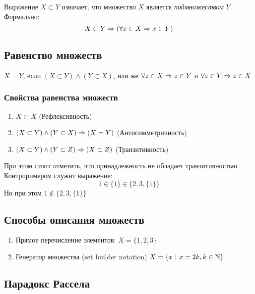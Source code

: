 \begin{definition}
    Выражение $X \subset Y$ означает, что множество $X$ является \textit{подмножеством} $Y$. Формально:
    $$
        X \subset Y \Rightarrow (\forall x \in X \Rightarrow x \in Y)
    $$
\end{definition}
 
\subsection{Равенство множеств}
 
\begin{definition}
    $X = Y$, если $(X \subset Y) \wedge (Y \subset X)$, или же $\forall z \in X \Rightarrow z \in Y$ и $\forall z \in Y \Rightarrow z \in X$
\end{definition}
 
\subsubsection{Свойства равенства множеств}
 
\begin{enumerate}
     \item $X \subset X$ (Рефлексивность)
     \item $(X \subset Y) \wedge (Y \subset X) \Rightarrow (X = Y)$ (Антисимметричность)
     \item $(X \subset Y) \wedge (Y \subset Z) \Rightarrow (X \subset Z)$ (Транзитивность)
\end{enumerate}
 
\begin{definition}
    При этом стоит отметить, что принадлежность не обладает транзитивностью. Контрпримером служит выражение:
    $$
        1 \in \{1\} \in \{2, 3, \{1\}\}
    $$
    Но при этом $1 \notin \{2, 3, \{1\}\}$
\end{definition}
 
\subsection{Способы описания множеств}
 
\begin{enumerate}
     \item Прямое перечисление элементов: $X = \{1, 2, 3\}$
     \item Генератор множества (set builder notation) $X = \{x\ |\ x = 2k, k \in \mathbb{N}\}$
\end{enumerate}
 
\subsection{Парадокс Рассела}
 
